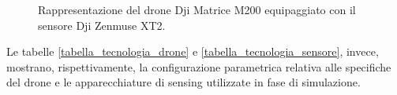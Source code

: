 \begin{figure}[H] 
    \captionsetup{justification=centering, margin=2cm, font=footnotesize}
    \begin{center}
    \end{center}
    \caption{Rappresentazione del drone Dji Matrice M200 equipaggiato con il sensore Dji Zenmuse XT2.}
    \label{dji_matrice}
\end{figure}

Le tabelle \ref{tabella_tecnologia_drone} e \ref{tabella_tecnologia_sensore}, invece, mostrano, rispettivamente, la configurazione parametrica relativa alle specifiche del drone  \cite{matrice200} e le apparecchiature di sensing utilizzate in fase di simulazione.

